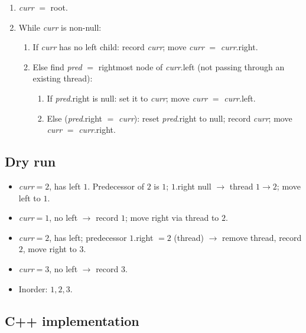 \begin{enumerate}
  \item \textit{curr} $=$ root.
  \item While \textit{curr} is non-null:
  \begin{enumerate}
    \item If \textit{curr} has no left child: record \textit{curr}; move
          \textit{curr} $=$ \textit{curr}.right.
    \item Else find \textit{pred} $=$ rightmost node of
          \textit{curr}.left (not passing through an existing thread):
    \begin{enumerate}
      \item If \textit{pred}.right is null: set it to \textit{curr};
            move \textit{curr} $=$ \textit{curr}.left.
      \item Else (\textit{pred}.right $=$ \textit{curr}): reset
            \textit{pred}.right to null; record \textit{curr}; move
            \textit{curr} $=$ \textit{curr}.right.
    \end{enumerate}
  \end{enumerate}
\end{enumerate}

\subsection*{Dry run}


\begin{itemize}
  \item \textit{curr}$=2$, has left $1$. Predecessor of $2$ is $1$;
        $1$.right null $\to$ thread $1\!\to\!2$; move left to $1$.
  \item \textit{curr}$=1$, no left $\to$ record $1$; move right via
        thread to $2$.
  \item \textit{curr}$=2$, has left; predecessor $1$.right $=2$ (thread)
        $\to$ remove thread, record $2$, move right to $3$.
  \item \textit{curr}$=3$, no left $\to$ record $3$.
  \item Inorder: $1,2,3$.
\end{itemize}

\subsection*{C++ implementation}

